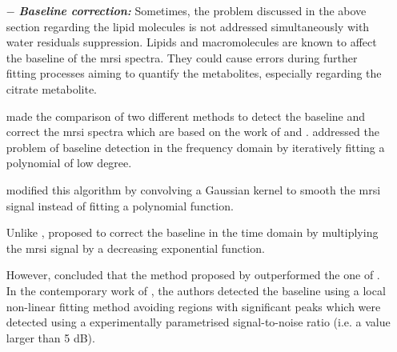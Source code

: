 \begin{enumerate}[leftmargin=*]
\item[$-$] \textbf{\textit{Baseline correction:}} Sometimes, the problem discussed in the above section regarding the lipid molecules is not addressed simultaneously with water residuals suppression. Lipids and macromolecules are known to affect the baseline of the \ac{mrsi} spectra. They could cause errors during further fitting processes aiming to quantify the metabolites, especially regarding the citrate metabolite.
	
\cite{Parfait2012} made the comparison of two different methods to detect the baseline and correct the \ac{mrsi} spectra which are based on the work of \cite{Lieber2003} and \cite{Devos2004}. \cite{Lieber2003} addressed the problem of baseline detection in the frequency domain by iteratively fitting a polynomial of low degree.%
%
%

\cite{Parfait2012} modified this algorithm by convolving a Gaussian kernel to smooth the \ac{mrsi} signal instead of fitting a polynomial function.%

Unlike \cite{Lieber2003}, \cite{Devos2004} proposed to correct the baseline in the time domain by multiplying the \ac{mrsi} signal by a decreasing exponential function.%
%

However, \cite{Parfait2012} concluded that the method proposed by \cite{Lieber2003} outperformed the one of \cite{Devos2004}. In the contemporary work of \cite{Tiwari2012}, the authors detected the baseline using a local non-linear fitting method avoiding regions with significant peaks which were detected using a experimentally parametrised signal-to-noise ratio (i.e. a value larger than 5 dB).


\end{enumerate}
